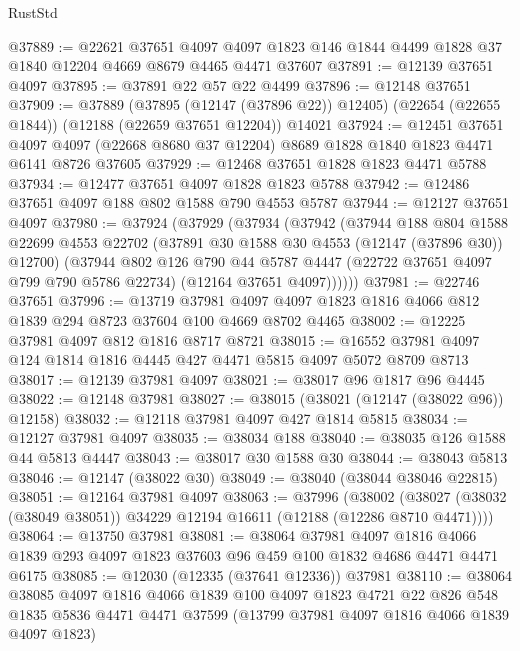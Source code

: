 \begin{lexlean}{RustStd}
\begin{coremodule}
@37889 := @22621
    @37651
    @4097
    @4097
    @1823
    @146
    @1844
    @4499
    @1828
    @37
    @1840
    @12204
    @4669
    @8679
    @4465
    @4471
    @37607
@37891 := @12139 @37651 @4097
@37895 := @37891 @22 @57 @22 @4499
@37896 := @12148 @37651
@37909 := @37889
    (@37895 (@12147 (@37896 @22)) @12405)
    (@22654 (@22655 @1844))
    (@12188 (@22659 @37651 @12204))
    @14021
@37924 := @12451
    @37651
    @4097
    @4097
    (@22668 @8680 @37 @12204)
    @8689
    @1828
    @1840
    @1823
    @4471
    @6141
    @8726
    @37605
@37929 := @12468 @37651 @1828 @1823 @4471 @5788
@37934 := @12477 @37651 @4097 @1828 @1823 @5788
@37942 := @12486 @37651 @4097 @188 @802 @1588 @790 @4553 @5787
@37944 := @12127 @37651 @4097
@37980 := @37924
    (@37929
      (@37934
        (@37942
          (@37944
            @188
            @804
            @1588
            @22699
            @4553
            @22702
            (@37891 @30 @1588 @30 @4553 (@12147 (@37896 @30)) @12700)
            (@37944
              @802
              @126
              @790
              @44
              @5787
              @4447
              (@22722 @37651 @4097 @799 @790 @5786 @22734)
              (@12164 @37651 @4097))))))
@37981 := @22746 @37651
@37996 := @13719
    @37981
    @4097
    @4097
    @1823
    @1816
    @4066
    @812
    @1839
    @294
    @8723
    @37604
    @100
    @4669
    @8702
    @4465
@38002 := @12225 @37981 @4097 @812 @1816 @8717 @8721
@38015 := @16552 @37981 @4097 @124 @1814 @1816 @4445 @427 @4471 @5815 @4097 @5072 @8709 @8713
@38017 := @12139 @37981 @4097
@38021 := @38017 @96 @1817 @96 @4445
@38022 := @12148 @37981
@38027 := @38015 (@38021 (@12147 (@38022 @96)) @12158)
@38032 := @12118 @37981 @4097 @427 @1814 @5815
@38034 := @12127 @37981 @4097
@38035 := @38034 @188
@38040 := @38035 @126 @1588 @44 @5813 @4447
@38043 := @38017 @30 @1588 @30
@38044 := @38043 @5813
@38046 := @12147 (@38022 @30)
@38049 := @38040 (@38044 @38046 @22815)
@38051 := @12164 @37981 @4097
@38063 := @37996
    (@38002 (@38027 (@38032 (@38049 @38051)) @34229 @12194 @16611 (@12188 (@12286 @8710 @4471))))
@38064 := @13750 @37981
@38081 := @38064
    @37981
    @4097
    @1816
    @4066
    @1839
    @293
    @4097
    @1823
    @37603
    @96
    @459
    @100
    @1832
    @4686
    @4471
    @4471
    @6175
@38085 := @12030 (@12335 (@37641 @12336)) @37981
@38110 := @38064
    @38085
    @4097
    @1816
    @4066
    @1839
    @100
    @4097
    @1823
    @4721
    @22
    @826
    @548
    @1835
    @5836
    @4471
    @4471
    @37599
    (@13799 @37981 @4097 @1816 @4066 @1839 @4097 @1823)

\end{coremodule}
\end{lexlean}
